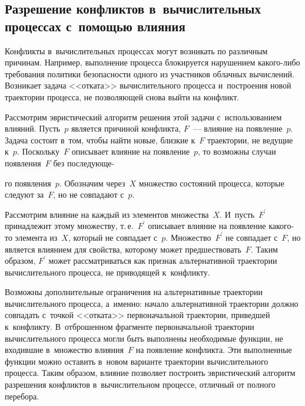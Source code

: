 \begin{multicols}{2}
\vspace*{-8pt}
  
  \subsection{Разрешение конфликтов в~вычислительных процессах 
с~помощью влияния}

\vspace*{-1pt}
  
  Конфликты в~вычислительных процессах могут возникать по различным 
причинам. Например, выполнение процесса блокируется нарушением  
ка\-ко\-го-ли\-бо требования политики безопасности одного из участников 
облачных вычислений. Возникает задача <<отката>> вычислительного 
процесса и~построения новой траектории процесса, не позволяющей снова 
выйти на конфликт. 
  
  Рассмотрим эвристический алгоритм решения этой задачи с~использованием 
влияний. Пусть~$p$ является причиной конфликта, $F$~--- влияние на 
появление~$p$. Задача состоит в~том, чтобы найти новые, близкие к~$F$ 
траектории, не ведущие к~$p$. Поскольку~$F$ описывает влияние на 
появление~$p$, то возможны случаи появления~$F$ без по\-сле\-ду\-юще-\linebreak\vspace*{-12pt}

\pagebreak

\noindent
го 
появления~$p$. Обозначим через~$X$ множество состояний процесса, которые 
следуют за~$F$, но не совпадают с~$p$. 
  
  Рассмотрим влияние на каждый из элементов множества~$X$. 
И~пусть~$F^\prime$ принадлежит этому множеству, т.\,е.\ $F^\prime$ 
описывает влияние на появление какого-то элемента из~$X$, который не 
совпадает с~$p$. Множество~$F^\prime$ не совпадает с~$F$, но является 
влиянием для свойства, которому может предшествовать~$F$. Таким образом, 
$F^\prime$ может рассматриваться как признак альтернативной траектории 
вычислительного процесса, не приводящей к~конфликту. 
  
  Возможны дополнительные ограничения на альтернативные траектории 
вычислительного процесса, а~именно: начало альтернативной траектории 
должно совпадать с~точкой <<отката>> первоначальной траектории, приведшей 
к~конфликту. В~отброшенном фрагменте первоначальной траектории 
вычислительного процесса могли быть выполнены необходимые функции, не 
входившие в~множество влияния~$F$ на появление конфликта. Эти 
выполненные функции можно оставить в~новом варианте траектории 
вычислительного процесса. Таким образом, влияние позволяет построить 
эвристический алгоритм разрешения конфликтов в~вычислительном процессе, 
отличный от полного перебора. 


\end{multicols}
